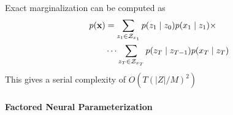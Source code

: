 \documentclass[11pt,a4paper]{article}
\begin{document}
\begin{comment}
We add parameterization constraints to ensure that this property holds.
Specifically, we require that each observed token $x$
only has a fixed number of states $z$ with $p(x \mid z) > 0$.
For each word, we call this support set $\mcC_x \subset \mcZ$.
This yields the following constrained emission distribution:
\begin{equation}
\label{eqn:sparse_emission}
p(x \mid z) \propto \mathbf{1}(z \in \mcC_x)e^{\phi_{xz}}
\end{equation}
\end{comment}

Exact marginalization can be computed as 
\begin{equation}
\label{eqn:sparse_marginalization}
\begin{aligned}
p(\mathbf{x}) &= \sum_{z_1 \in \mathcal{Z}_{x_1}} p(z_1\mid z_0)p(x_1 \mid z_1) \times\\
    &\cdots
    \sum_{z_T \in \mathcal{Z}_{x_T}} p(z_T \mid z_{T-1})p(x_T \mid z_T)
\end{aligned}
\end{equation}
This gives a serial complexity of $O(T(|Z|/M)^2)$




\paragraph{Factored Neural Parameterization}
\end{document}
